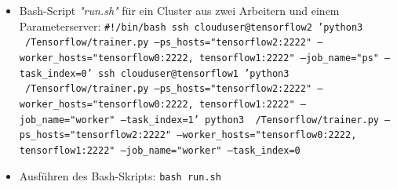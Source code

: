 \begin{itemize}
	\item Bash-Script \textit{"run.sh"} für ein Cluster aus zwei Arbeitern und einem Parameterserver: \newline
		\texttt{\#!/bin/bash \newline
			ssh clouduser@tensorflow2 \newline
			\hspace*{5mm} 'python3 ~/Tensorflow/trainer.py \newline
			\hspace*{5mm} --ps\_hosts="tensorflow2:2222" \newline
			\hspace*{5mm} --worker\_hosts="tensorflow0:2222, \newline 
			\hspace*{10mm} tensorflow1:2222" \newline
			\hspace*{5mm} --job\_name="ps" --task\_index=0' \newline
			ssh clouduser@tensorflow1 \newline
			\hspace*{5mm} 'python3 ~/Tensorflow/trainer.py \newline
			\hspace*{5mm} --ps\_hosts="tensorflow2:2222" \newline
			\hspace*{5mm} --worker\_hosts="tensorflow0:2222, \newline
			\hspace*{10mm} tensorflow1:2222" \newline
			\hspace*{5mm} --job\_name="worker" --task\_index=1' \newline
			python3 ~/Tensorflow/trainer.py \newline
			\hspace*{5mm} --ps\_hosts="tensorflow2:2222" \newline
			\hspace*{5mm} --worker\_hosts="tensorflow0:2222, \newline
			\hspace*{10mm} tensorflow1:2222" \newline
			\hspace*{5mm} --job\_name="worker" --task\_index=0}
	\item Ausführen des Bash-Skripts: \newline
		\texttt{bash run.sh}
\end{itemize}

